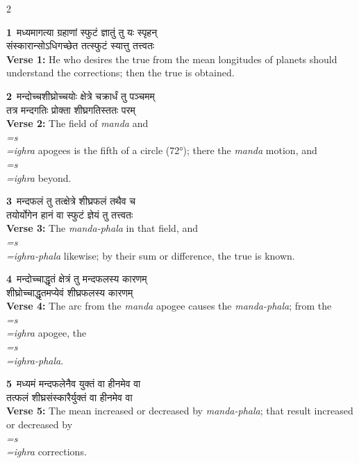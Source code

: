 \documentclass[11pt,a4paper]{article}
\newcommand{\dev}[1]{{\devanagarifont #1}}
\newcommand{\iast}[1]{\textit{#1}}
\newcommand{\vnum}[1]{\textcolor{versenumbercolor}{\textbf{#1}}}
\begin{document}
\begin{paracol}{2}

\switchcolumn[0]
\vnum{1}\ \dev{मध्यमागत्या ग्रहाणां स्फुटं ज्ञातुं तु यः स्पृहन्}\\
\dev{संस्कारान्सोऽधिगच्छेत तत्स्फुटं स्यात्तु तत्त्वतः}\\
\switchcolumn[1]
\textbf{Verse 1:} He who desires the true from the mean longitudes of planets should understand the corrections; then the true is obtained.

\switchcolumn[0]
\vnum{2}\ \dev{मन्दोच्चशीघ्रोच्चयोः क्षेत्रे चक्रार्धं तु पञ्चमम्}\\
\dev{तत्र मन्दगतिः प्रोक्ता शीघ्रगतिस्ततः परम्}\\
\switchcolumn[1]
\textbf{Verse 2:} The field of \iast{manda} and \iast{\\=s\\=ighra} apogees is the fifth of a circle (72°); there the \iast{manda} motion, and \iast{\\=s\\=ighra} beyond.

\switchcolumn[0]
\vnum{3}\ \dev{मन्दफलं तु तत्क्षेत्रे शीघ्रफलं तथैव च}\\
\dev{तयोर्योगेन हानं वा स्फुटं ज्ञेयं तु तत्त्वतः}\\
\switchcolumn[1]
\textbf{Verse 3:} The \iast{manda-phala} in that field, and \iast{\\=s\\=ighra-phala} likewise; by their sum or difference, the true is known.

\switchcolumn[0]
\vnum{4}\ \dev{मन्दोच्चाद्धृतं क्षेत्रं तु मन्दफलस्य कारणम्}\\
\dev{शीघ्रोच्चाद्धृतमप्येवं शीघ्रफलस्य कारणम्}\\
\switchcolumn[1]
\textbf{Verse 4:} The arc from the \iast{manda} apogee causes the \iast{manda-phala}; from the \iast{\\=s\\=ighra} apogee, the \iast{\\=s\\=ighra-phala}.

\switchcolumn[0]
\vnum{5}\ \dev{मध्यमं मन्दफलेनैव युक्तं वा हीनमेव वा}\\
\dev{तत्फलं शीघ्रसंस्कारैर्युक्तं वा हीनमेव वा}\\
\switchcolumn[1]
\textbf{Verse 5:} The mean increased or decreased by \iast{manda-phala}; that result increased or decreased by \iast{\\=s\\=ighra} corrections.


\end{paracol}
\end{document}
